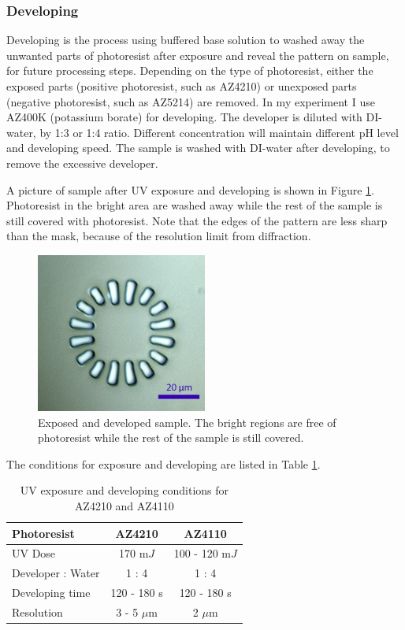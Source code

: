 \documentclass[pdflatex, sectionletters, 12pt]{pittetd}    %
\begin{document}
\subsubsection{Developing}

Developing is the process using buffered base solution to washed away the unwanted parts of photoresist after exposure and reveal the pattern on sample, for future processing steps. Depending on the type of photoresist, either the exposed parts (positive photoresist, such as AZ4210) or unexposed parts (negative photoresist, such as AZ5214) are removed. In my experiment I use AZ400K (potassium borate) for developing. The developer is diluted with DI-water, by 1:3 or 1:4 ratio. Different concentration will maintain different pH level and developing speed. The sample is washed with DI-water after developing, to remove the excessive developer. 

A picture of sample after UV exposure and developing is shown in Figure \ref{FIG:Developed}. Photoresist in the bright area are washed away while the rest of the sample is still covered with photoresist. Note that the edges of the pattern are less sharp than the mask, because of the resolution limit from diffraction. 
\\
\begin{figure}[h!]
	\centering
	\includegraphics[width=0.5\textwidth]{Drawing/Developed.png}
	\caption{Exposed and developed sample. The bright regions are free of photoresist while the rest of the sample is still covered.}
	\label{FIG:Developed}
\end{figure}

The conditions for exposure and developing are listed in Table \ref{tab:photoresistsExposureDeveloping}.

\begin{table}[h!]
	\centering
	\begin{tabular}{l|cc}
		\hline
		Photoresist	&	AZ4210	&	AZ4110 \\ \hline
		UV Dose	&	170 m$J$	& 100 - 120 m$J$	\\ 
		Developer : Water	&	1 : 4	&	1 : 4	\\
		Developing time	&	120 - 180 s	&	120 - 180 s \\ 
		Resolution	&	3 - 5 $\mu$m	&	2 $\mu$m	\\ \hline
	\end{tabular}
	\caption{UV exposure and developing conditions for AZ4210 and AZ4110}
	\label{tab:photoresistsExposureDeveloping}	
\end{table}
\end{document}
